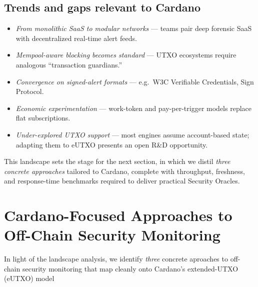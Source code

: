 \documentclass{scrreport}
\begin{document}
\subsection{Trends and gaps relevant to Cardano}
\begin{itemize}
  \item \emph{From monolithic SaaS to modular networks} — teams pair deep forensic SaaS with
        decentralized real-time alert feeds.
  \item \emph{Mempool-aware blocking becomes standard} — UTXO ecosystems require analogous
        ``transaction guardians.''  
  \item \emph{Convergence on signed-alert formats} — e.g.\ W3C Verifiable Credentials, Sign Protocol.  
  \item \emph{Economic experimentation} — work-token and pay-per-trigger models replace flat
        subscriptions.  
  \item \emph{Under-explored UTXO support} — most engines assume account-based state; adapting them to
        eUTXO presents an open R\&D opportunity.
\end{itemize}

This landscape sets the stage for the next section, in which we distil \emph{three concrete approaches}
tailored to Cardano, complete with throughput, freshness, and response-time benchmarks required to
deliver practical Security Oracles.


\section{Cardano-Focused Approaches to Off-Chain Security Monitoring}
In light of the landscape analysis, we identify \emph{three} concrete aproaches to off-chain
security monitoring that map cleanly onto Cardano’s extended-UTXO (eUTXO) model 
\end{document}
